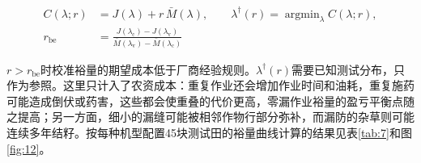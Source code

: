 \documentclass[preprint,12pt,number,sort&compress]{elsarticle}
\begin{document}
\begin{equation}
\begin{aligned}
C(\lambda;r)&=J(\lambda)+r\,\bar M(\lambda),\qquad \lambda^\dagger(r)=\mathop{\arg\min}_{\lambda}C(\lambda;r),\\
r_\mathrm{be}&=\frac{J(\lambda_\mathrm c)-J(\lambda_\mathrm v)}{\bar M(\lambda_\mathrm v)-\bar M(\lambda_\mathrm c)}
\end{aligned}
\end{equation}

\(r>r_\mathrm{be}\)时校准裕量的期望成本低于厂商经验规则。\(\lambda^\dagger(r)\)需要已知测试分布，只作为参照。这里只计入了农资成本：重复作业还会增加作业时间和油耗，重复施药可能造成倒伏或药害，这些都会使重叠的代价更高，零漏作业裕量的盈亏平衡点随之提高；另一方面，细小的漏缝可能被相邻作物行部分弥补，而漏防的杂草则可能连续多年结籽。按每种机型配置45块测试田的裕量曲线计算的结果见表\ref{tab:7}和图\ref{fig:12}。
\end{document}

